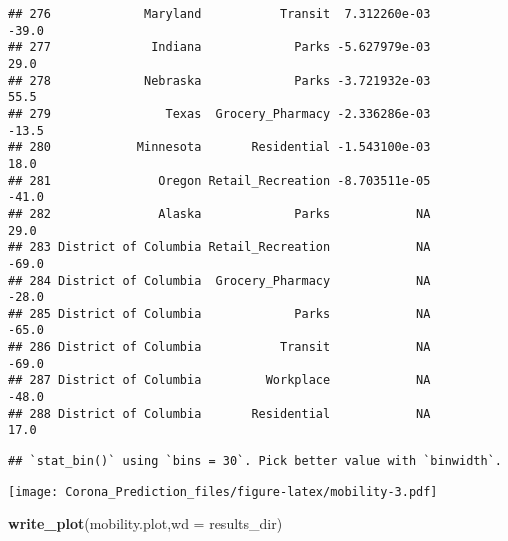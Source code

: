 \documentclass[]{article}
\newenvironment{Shaded}{\begin{snugshade}}{\end{snugshade}}
\newcommand{\KeywordTok}[1]{\textcolor[rgb]{0.13,0.29,0.53}{\textbf{{#1}}}}
\newcommand{\DataTypeTok}[1]{\textcolor[rgb]{0.13,0.29,0.53}{{#1}}}
\newcommand{\StringTok}[1]{\textcolor[rgb]{0.31,0.60,0.02}{{#1}}}
\newcommand{\NormalTok}[1]{{#1}}
\begin{document}
\begin{verbatim}
## 276             Maryland           Transit  7.312260e-03         -39.0
## 277              Indiana             Parks -5.627979e-03          29.0
## 278             Nebraska             Parks -3.721932e-03          55.5
## 279                Texas  Grocery_Pharmacy -2.336286e-03         -13.5
## 280            Minnesota       Residential -1.543100e-03          18.0
## 281               Oregon Retail_Recreation -8.703511e-05         -41.0
## 282               Alaska             Parks            NA          29.0
## 283 District of Columbia Retail_Recreation            NA         -69.0
## 284 District of Columbia  Grocery_Pharmacy            NA         -28.0
## 285 District of Columbia             Parks            NA         -65.0
## 286 District of Columbia           Transit            NA         -69.0
## 287 District of Columbia         Workplace            NA         -48.0
## 288 District of Columbia       Residential            NA          17.0
\end{verbatim}

\begin{Shaded}
\end{Shaded}

\begin{verbatim}
## `stat_bin()` using `bins = 30`. Pick better value with `binwidth`.
\end{verbatim}

\texttt{[image: Corona\_Prediction\_files/figure-latex/mobility-3.pdf]}

\begin{Shaded}
\begin{Highlighting}[]
\KeywordTok{write_plot}\NormalTok{(mobility.plot,}\DataTypeTok{wd =} \NormalTok{results_dir)}
\end{Highlighting}
\end{Shaded}
\end{document}
